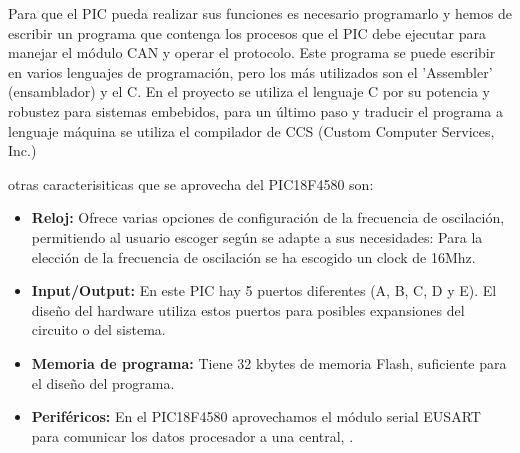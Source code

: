 Para que el PIC pueda realizar sus funciones es necesario programarlo y hemos de escribir un programa que contenga los procesos que el PIC debe ejecutar para manejar el módulo CAN y operar el protocolo. Este programa se puede escribir en varios lenguajes de programación, pero los  más utilizados son el ’Assembler’ (ensamblador) y el C. En el proyecto se utiliza el lenguaje C por su potencia y robustez para sistemas embebidos, para un último paso y traducir el programa a lenguaje máquina se utiliza el compilador  de CCS (Custom Computer Services, Inc.)

otras caracterisiticas que se aprovecha del PIC18F4580 son: 
\begin{itemize}
\item {\textbf{Reloj:}} Ofrece varias opciones de configuración de la frecuencia de oscilación, permitiendo al usuario escoger según se adapte a sus necesidades:
Para la elección de la frecuencia de oscilación se ha escogido un clock de 16Mhz.
\item {\textbf{Input/Output:}} En este PIC hay 5 puertos diferentes (A, B, C, D y E). El diseño del hardware utiliza estos puertos para posibles expansiones del circuito o del sistema. 
\item {\textbf{Memoria de programa:}} Tiene 32 kbytes de memoria Flash, suficiente para el diseño del programa.
\item {\textbf{Periféricos:}} En el PIC18F4580 aprovechamos el módulo serial EUSART para comunicar los datos procesador a una central, \cite{DaP}.

\end{itemize}


